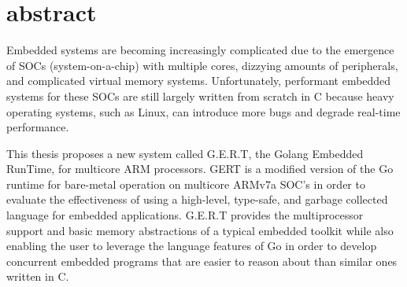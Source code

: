 % 
% 
%
\section{abstract}

Embedded systems are becoming increasingly complicated due to the emergence of
SOCs (system-on-a-chip) with multiple cores, dizzying amounts of peripherals, and
complicated virtual memory systems. Unfortunately, performant embedded systems
for these SOCs are still largely written from scratch in C because heavy
operating systems, such as Linux, can introduce more bugs and degrade real-time
performance.

This thesis proposes a new system called G.E.R.T, the Golang Embedded RunTime,
for multicore ARM processors.
GERT is a modified version of the Go runtime for
bare-metal operation on multicore ARMv7a SOC's in order to evaluate
the effectiveness of using a high-level, type-safe, and garbage collected
language for embedded applications. G.E.R.T
provides the multiprocessor support and basic memory abstractions of a
typical embedded toolkit while also enabling the user to leverage the language features
of Go in order to develop
concurrent embedded programs that are easier to reason about than similar ones
written in C.

